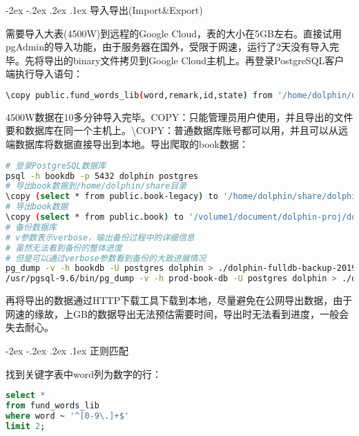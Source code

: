 \documentclass[8pt]{book}
\makeatletter
\numberwithin{dummy}{section}
\theoremstyle{ocrenumbox}
\theoremstyle{blacknumex}
\theoremstyle{blacknumbox}
\theoremstyle{ocrenum}
\renewcommand\paragraph{\@startsection{paragraph}{4}{\z@}
	{-2ex \@plus-.2ex \@minus .2ex}
	{.1ex}
	{\normalfont\small\sffamily\bfseries}}
\makeatother
\begin{document}
\paragraph{导入导出(Import\&Export)}

需要导入大表(4500W)到远程的Google Cloud，表的大小在5GB左右。直接试用pgAdmin的导入功能，由于服务器在国外，受限于网速，运行了2天没有导入完毕。先将导出的binary文件拷贝到Google Cloud主机上。再登录PostgreSQL客户端执行导入语句：

\begin{lstlisting}[language=Bash]
\copy public.fund_words_lib(word,remark,id,state) from '/home/dolphin/dolphin-words' encoding 'utf8';
\end{lstlisting}

4500W数据在10多分钟导入完毕。COPY：只能管理员用户使用，并且导出的文件要和数据库在同一个主机上。\textbackslash COPY：普通数据库账号都可以用，并且可以从远端数据库将数据直接导出到本地。导出爬取的book数据：

\begin{lstlisting}[language=Bash]
# 登录PostgreSQL数据库
psql -h bookdb -p 5432 dolphin postgres
# 导出book数据到/home/dolphin/share目录
\copy (select * from public.book-legacy) to '/home/dolphin/share/dolphin-book-binary-bak-201904012112' with Binary
# 导出book数据
\copy (select * from public.book) to '/volume1/document/dolphin-proj/dolphin-book-text-bak-201902091012'
# 备份数据库
# v参数表示verbose，输出备份过程中的详细信息
# 虽然无法看到备份的整体进度
# 但是可以通过verbose参数看到备份的大致进展情况
pg_dump -v -h bookdb -U postgres dolphin > ./dolphin-fulldb-backup-201902100030.bak
/usr/pgsql-9.6/bin/pg_dump -v -h prod-book-db -U postgres dolphin > ./dolphin-fulldb-backup-201903261013.bak
\end{lstlisting}

再将导出的数据通过HTTP下载工具下载到本地，尽量避免在公网导出数据，由于网速的缘故，上GB的数据导出无法预估需要时间，导出时无法看到进度，一般会失去耐心。

\paragraph{正则匹配}

找到关键字表中word列为数字的行：

\begin{lstlisting}[language=SQL]
select * 
from fund_words_lib 
where word ~ '^[0-9\.]+$' 
limit 2;
\end{lstlisting}
\end{document}
